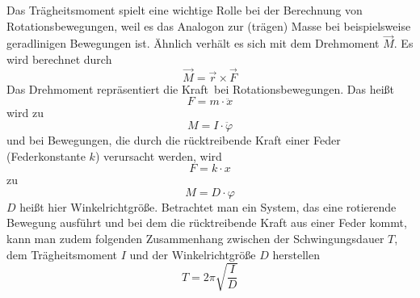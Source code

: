 Das Trägheitsmoment spielt eine wichtige Rolle bei der Berechnung von Rotationsbewegungen, weil es das Analogon zur (trägen) Masse bei beispielsweise geradlinigen Bewegungen ist. Ähnlich verhält es sich mit dem Drehmoment $\vec{M}$. Es wird berechnet durch
\begin{equation}
	\vec{M} = \vec{r}\times\vec{F} %
\end{equation}
Das Drehmoment repräsentiert die \glqq Kraft\grqq\ bei Rotationsbewegungen. Das heißt
\begin{equation}
	F = m \cdot \ddot{x}
\end{equation}
wird zu
\begin{equation}
	 M = I \cdot \ddot{\varphi}
\end{equation}
und bei Bewegungen, die durch die rücktreibende Kraft einer Feder (Federkonstante $k$) verursacht werden, wird
\begin{equation}
	F = k \cdot x
\end{equation}
zu
\begin{equation}
M = D \cdot \varphi
\end{equation}
$D$ heißt hier Winkelrichtgröße. %
Betrachtet man ein System, das eine rotierende Bewegung ausführt und bei dem die rücktreibende Kraft aus einer Feder kommt, kann man zudem folgenden Zusammenhang zwischen der Schwingungsdauer $T$, dem Trägheitsmoment $I$ und der Winkelrichtgröße $D$ herstellen
\begin{equation}
	T = 2\pi\sqrt{\frac{I}{D}} %
	\label{eq: Periodendauer}
\end{equation}

